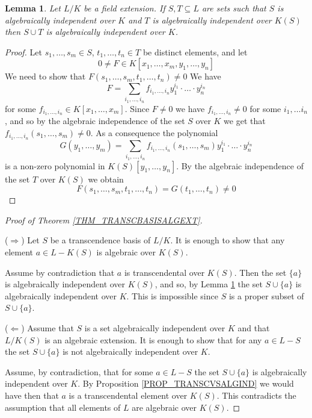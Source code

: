 \documentclass[12pt, letterpaper, oneside]{article}
\theoremstyle{plain}
\newtheorem{lemma}[theorem]{Lemma}
\theoremstyle{definition}
\newcommand{\vs}{\vskip 5mm}
\begin{document}
\vs\vs

\begin{lemma}
\label{LEMMA_UNIONALGINDEP}
Let $L/K$ be a field extension. If $S, T\subseteq L$ are sets such that $S$ is algebraically 
independent over $K$ and $T$ is algebraically independent over $K(S)$ then $S\cup T$
is algebraically independent over $K$. 
\end{lemma}


\vs


\begin{proof}
Let $s_{1}, \dots, s_{m}\in S$, $t_{1}, \dots, t_{n}\in T$ be distinct elements, and let 
$$0\neq F\in K[x_{1}, \dots, x_{m}, y_{1}, \dots, y_{n}]$$
We need to show that $F(s_{1},\dots,  s_{m}, t_{1}, \dots, t_{n}) \neq 0$
We have 
$$F = \sum_{i_{1}, \dots, i_{n}}f_{i_{1}, \dots, i_{n}}y_{1}^{i_{1}}\cdot{\dots}\cdot y_{n}^{i_{n}}$$
for some $f_{i_{1}, \dots, i_{n}}\in K[x_{1}, \dots, x_{m}]$. Since $F\neq 0$ we have 
$f_{i_{1}, \dots, i_{n}}\neq 0$ for some $i_{1}, \dots i_{n}$, and so by the algebraic independence
of the set $S$ over $K$ we get that $f_{i_{1}, \dots, i_{n}}(s_{1}, \dots, s_{m})\neq 0$. As a consequence 
the polynomial 
$$G(y_{1}, \dots, y_{m}) = 
 \sum_{i_{1}, \dots, i_{n}}f_{i_{1}, \dots, i_{n}}(s_{1}, \dots, s_{m})y_{1}^{i_{1}}\cdot{\dots}\cdot y_{n}^{i_{n}}$$
is a non-zero polynomial in $K(S)[y_{1}, \dots, y_{n}]$. By the algebraic independence of 
the set $T$ over $K(S)$ we obtain
$$F(s_{1}, \dots , s_{m}, t_{1}, \dots, t_{n}) = G(t_{1}, \dots, t_{n})\neq 0$$
\end{proof}


\vs\vs

\begin{proof}[Proof of Theorem \ref{THM_TRANSCBASISALGEXT}] \ 

($\Rightarrow$) Let  $S$ be a transcendence basis of $L/K$. It is enough 
to show that any element $a\in L - K(S)$ is  algebraic over $K(S)$. 

Assume by contradiction that  
$a$ is transcendental over $K(S)$. Then the set $\{a\}$ is algebraically  independent 
over $K(S)$, and so, by Lemma  \ref{LEMMA_UNIONALGINDEP} the set $S\cup \{a\}$
is algebraically independent over $K$. This is impossible since $S$ is a proper subset of 
$S\cup \{a\}$. 


\vs

($\Leftarrow$) Assume that $S$ is a set  algebraically independent over $K$ and that $L/K(S)$
is an algebraic extension. It is enough to show that for any $a\in L - S$ the set 
$S\cup \{a\}$ is not algebraically independent over $K$. 

Assume, by contradiction, that for some $a\in L-S$ the set $S\cup\{a\}$ is 
algebraically independent over $K$. By Proposition \ref{PROP_TRANSCVSALGIND}
we would have then that $a$ is a transcendental element over $K(S)$. This  contradicts 
the assumption that all elements of $L$ are algebraic over $K(S)$. 
\end{proof}
\end{document}
